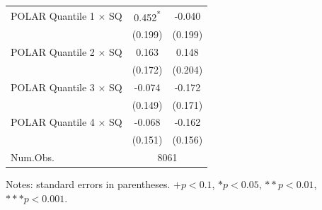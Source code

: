 \begin{table}[!htbp]
\centering\scriptsize
\begin{threeparttable}
\begin{tabular}{lcc}
\midrule
POLAR Quantile 1 $\times$ SQ& 0.452\textsuperscript{*} & -0.040 \\
 & (0.199) & (0.199) \\
POLAR Quantile 2 $\times$ SQ& 0.163 & 0.148 \\
 & (0.172) & (0.204) \\
POLAR Quantile 3 $\times$ SQ& -0.074 & -0.172 \\
 & (0.149) & (0.171) \\
POLAR Quantile 4 $\times$ SQ& -0.068 & -0.162 \\
 & (0.151) & (0.156) \\
\midrule
Num.Obs. & \multicolumn{2}{c}{8061 \quad 8162} \\
\bottomrule
\end{tabular}
\end{threeparttable}
\end{table}

\begin{center}\scriptsize
Notes: standard errors in parentheses. $+ p<0.1$, $* p<0.05$, $** p<0.01$, $*** p<0.001$.
\end{center}

\endgroup
